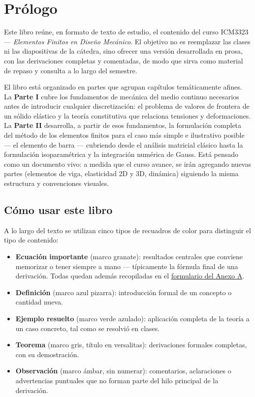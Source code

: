 \chapter*{Prólogo}

Este libro reúne, en formato de texto de estudio, el contenido del curso ICM3323 --- \emph{Elementos Finitos en Diseño Mecánico}. El objetivo no es reemplazar las clases ni las diapositivas de la cátedra, sino ofrecer una versión desarrollada en prosa, con las derivaciones completas y comentadas, de modo que sirva como material de repaso y consulta a lo largo del semestre.

El libro está organizado en partes que agrupan capítulos temáticamente afines. La \textbf{Parte I} cubre los fundamentos de mecánica del medio continuo necesarios antes de introducir cualquier discretización: el problema de valores de frontera de un sólido elástico y la teoría constitutiva que relaciona tensiones y deformaciones. La \textbf{Parte II} desarrolla, a partir de esos fundamentos, la formulación completa del método de los elementos finitos para el caso más simple e ilustrativo posible --- el elemento de barra --- cubriendo desde el análisis matricial clásico hasta la formulación isoparamétrica y la integración numérica de Gauss. Está pensado como un documento vivo: a medida que el curso avance, se irán agregando nuevas partes (elementos de viga, elasticidad 2D y 3D, dinámica) siguiendo la misma estructura y convenciones visuales.

\section*{Cómo usar este libro}

A lo largo del texto se utilizan cinco tipos de recuadros de color para distinguir el tipo de contenido:

\begin{itemize}[leftmargin=1.4em]
  \item[] \textcolor{ucred}{\textbf{Ecuación importante}} (marco granate): resultados centrales que conviene memorizar o tener siempre a mano --- típicamente la fórmula final de una derivación. Todas quedan además recopiladas en el \hyperref[anexo:formulario]{formulario del Anexo A}.
  \item[] \textcolor{ucblue}{\textbf{Definición}} (marco azul pizarra): introducción formal de un concepto o cantidad nueva.
  \item[] \textcolor{ucteal}{\textbf{Ejemplo resuelto}} (marco verde azulado): aplicación completa de la teoría a un caso concreto, tal como se resolvió en clases.
  \item[] \textcolor{ucgray}{\textbf{Teorema}} (marco gris, título en versalitas): derivaciones formales completas, con su demostración.
  \item[] \textcolor{ucamber}{\textbf{Observación}} (marco ámbar, sin numerar): comentarios, aclaraciones o advertencias puntuales que no forman parte del hilo principal de la derivación.
\end{itemize}

